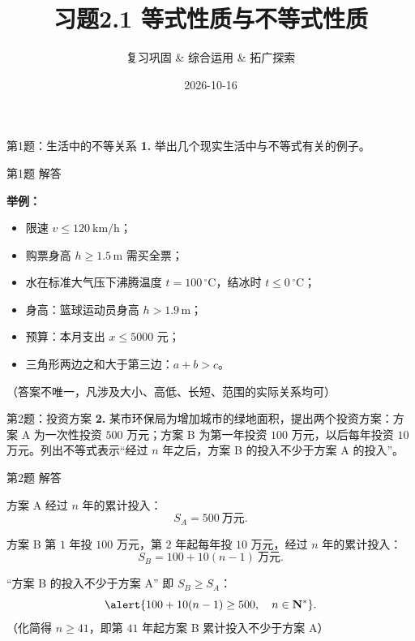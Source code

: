 \documentclass[10pt,aspectratio=169,serif]{beamer}
\title[习题2.1]{习题2.1 等式性质与不等式性质}
\subtitle{复习巩固 \& 综合运用 \& 拓广探索}
\author{}
\institute{}
\date{2026-10-16}
\begin{document}
\begin{frame}
  \titlepage
\end{frame}

\begin{frame}[t]{第1题：生活中的不等关系}
\textbf{1.} 举出几个现实生活中与不等式有关的例子。
\end{frame}

\begin{frame}[t]{第1题 解答}
\begin{tcolorbox}[colback=orange!10,colframe=orange,title=\textbf{参考答案}]
\textbf{举例：}
\begin{itemize}
  \item 限速 $v \le 120\ \mathrm{km/h}$；
  \item 购票身高 $h \ge 1.5\,\mathrm{m}$ 需买全票；
  \item 水在标准大气压下沸腾温度 $t = 100\,^\circ\mathrm{C}$，结冰时 $t \le 0\,^\circ\mathrm{C}$；
  \item 身高：篮球运动员身高 $h > 1.9\,\mathrm{m}$；
  \item 预算：本月支出 $x \le 5000$ 元；
  \item 三角形两边之和大于第三边：$a+b>c$。
\end{itemize}
\small（答案不唯一，凡涉及大小、高低、长短、范围的实际关系均可）
\end{tcolorbox}
\end{frame}

\begin{frame}[t]{第2题：投资方案}
\textbf{2.} 某市环保局为增加城市的绿地面积，提出两个投资方案：方案 A 为一次性投资 $500$ 万元；方案 B 为第一年投资 $100$ 万元，以后每年投资 $10$ 万元。列出不等式表示“经过 $n$ 年之后，方案 B 的投入不少于方案 A 的投入”。
\end{frame}

\begin{frame}[t]{第2题 解答}
\begin{tcolorbox}[colback=orange!10,colframe=orange,title=\textbf{解}]
方案 A 经过 $n$ 年的累计投入：
\[
S_A = 500\ \text{万元}.
\]

方案 B 第 $1$ 年投 $100$ 万元，第 $2$ 年起每年投 $10$ 万元，经过 $n$ 年的累计投入：
\[
S_B = 100 + 10(n-1)\ \text{万元}.
\]

“方案 B 的投入不少于方案 A” 即 $S_B \ge S_A$：
\[
\alert{100 + 10(n-1) \ge 500,\quad n\in \mathbf{N}^*}.
\]
\small（化简得 $n\ge 41$，即第 $41$ 年起方案 B 累计投入不少于方案 A）
\end{tcolorbox}
\end{frame}
\end{document}
